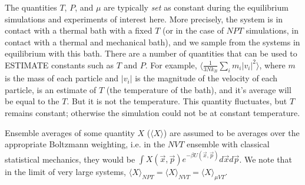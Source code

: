 \documentclass[9pt,bestpractices]{livecoms}
\begin{document}
The quantities $T$, $P$, and $\mu$ are typically {\em set} as constant
during the equilibrium simulations and experiments of interest
here. More precisely, the system is in contact with a thermal bath
with a fixed $T$ (or in the case of $NPT$ simulations, in contact with
a thermal and mechanical bath), and we sample from the systems in
equilibrium with this bath.  There are a number of quantities that can
be used to ESTIMATE constants such as $T$ and $P$. For example,
$\langle \frac{1}{3Nk_B}\sum_i m_i |v_i|^2\rangle$, where $m$ is the
mass of each particle and $|v_i|$ is the magnitude of the velocity of
each particle, is an estimate of $T$ (the temperature of the bath), and
it's average will be equal to the $T$. But it is not the
temperature. This quantity fluctuates, but $T$ remains
constant; otherwise the simulation could not be at constant
temperature.



Ensemble averages of some quantity $X$ ($\langle X \rangle$) are
assumed to be averages over the appropriate Boltzmann weighting,
i.e. in the $NVT$ ensemble with classical statistical mechanics, they
would be $\int X(\vec{x},\vec{p}) e^{-\beta U(\vec{x},\vec{p})} d\vec{x}d\vec{p}$. We
note that in the limit of very large systems, ${\langle X \rangle}_{NPT}
= {\langle {X} \rangle}_{NVT} = {\langle {X} \rangle}_{\mu VT}$.
\end{document}
